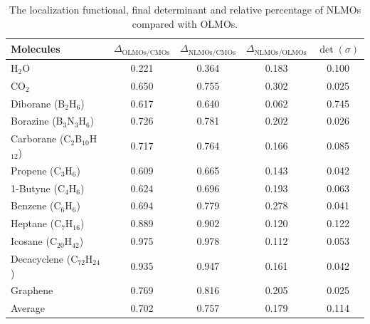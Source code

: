 \documentclass[aps,prl,reprint,amsmath,amssymb]{revtex4-1}
\begin{document}
\begin{table}[tb]
\caption{The localization functional, final determinant and relative percentage of NLMOs compared with OLMOs.}
\label{tab:loc}
\centering
\begin{tabular}{l c c c c}
\hline\hline
Molecules & $\Delta_{\text{OLMOs/CMOs}}$  & $\Delta_{\text{NLMOs/CMOs}}$ & $\Delta_{\text{NLMOs/OLMOs}}$ & $\det(\sigma)$ \\
\hline
H$_2$O & 0.221 & 0.364 & 0.183 & 0.100 \\ 
CO$_2$ & 0.650 & 0.755 & 0.302 & 0.025 \\
Diborane (B$_2$H$_6$) & 0.617 & 0.640 & 0.062 & 0.745 \\
Borazine (B$_3$N$_3$H$_6$) & 0.726 & 0.781 & 0.202 & 0.026 \\
Carborane (C$_2$B$_{10}$H$_{12}$) & 0.717 & 0.764 & 0.166 & 0.085 \\ 
Propene (C$_3$H$_6$) & 0.609 & 0.665 & 0.143 & 0.042 \\
1-Butyne (C$_4$H$_6$) & 0.624 & 0.696 & 0.193 & 0.063 \\
Benzene (C$_6$H$_6$) & 0.694 & 0.779 & 0.278 & 0.041 \\ 
Heptane (C$_7$H$_{16}$) & 0.889 & 0.902 & 0.120 & 0.122 \\ 
Icosane (C$_{20}$H$_{42}$) & 0.975 & 0.978 & 0.112 & 0.053 \\ 
Decacyclene (C$_{72}$H$_{24}$) & 0.935 & 0.947 & 0.161 & 0.042 \\ 
Graphene & 0.769 & 0.816 & 0.205 & 0.025 \\
\hline
Average & 0.702 & 0.757 & 0.179 & 0.114 \\
\hline
\hline
\end{tabular}
\label{table:nonlin}
\end{table}


\end{document}
